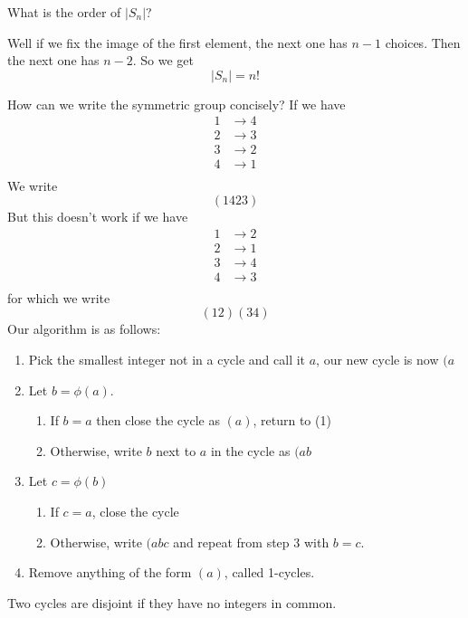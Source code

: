 \documentclass[a5paper]{article}
\begin{document}
\begin{note}
  \begin{field}
    What is the order of $|S_n|$?
  \end{field}

  \begin{field}
    Well if we fix the image of the first element, the next one has $n-1$
    choices. Then the next one has $n-2$. So we get
    \begin{equation*}
      |S_n|=n!
    \end{equation*}
  \end{field}
\end{note}

\begin{remark}
	How can we write the symmetric group concisely? If we have
  \begin{align*}
    1 &\to 4 \\
    2 &\to 3 \\
    3 &\to 2 \\
    4 &\to 1 \\
  \end{align*}
  We write
  \begin{equation*}
    (1 4 2 3)
  \end{equation*}
  But this doesn't work if we have
  \begin{align*}
    1 &\to 2 \\
    2 &\to 1 \\
    3 &\to 4 \\
    4 &\to 3 \\
  \end{align*}
  for which we write
  \begin{equation*}
    (1 2)(3 4)
  \end{equation*}
  Our algorithm is as follows:
  \begin{enumerate}%
    \item Pick the smallest integer not in a cycle and call it $a$, our new
      cycle is now $(a$
    \item Let $b=\phi(a)$. 
      \begin{enumerate}%
        \item If $b=a$ then close the cycle as $(a)$, return to (1)
        \item Otherwise, write $b$ next to $a$ in the cycle as $(a b$
      \end{enumerate}
    \item Let $c=\phi(b)$
      \begin{enumerate}%
        \item If $c=a$, close the cycle
        \item Otherwise, write $(a b c$ and repeat from step 3 with $b=c$.
      \end{enumerate}
    \item Remove anything of the form $(a)$, called 1-cycles.
  \end{enumerate}

  Two cycles are disjoint if they have no integers in common.
\end{remark}
\end{document}
